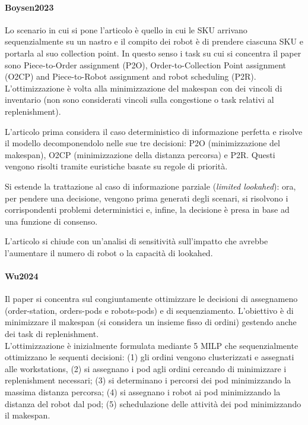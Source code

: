 \documentclass{article}
\begin{document}
\paragraph{Boysen2023 \cite{Boysen2023}}
Lo scenario in cui si pone l'articolo è quello in cui le SKU arrivano sequenzialmente su un nastro e il compito dei robot è di prendere ciascuna SKU e portarla al suo collection point. In questo senso i task su cui si concentra il paper sono Piece-to-Order assignment (P2O), Order-to-Collection Point assignment (O2CP) and Piece-to-Robot assignment and robot scheduling (P2R).
L'ottimizzazione è volta alla minimizzazione del makespan con dei vincoli di inventario (non sono considerati vincoli sulla congestione o task relativi al replenishment).

L'articolo prima considera il caso deterministico di informazione perfetta e risolve il modello decomponendolo nelle sue tre decisioni: P2O (minimizzazione del makespan), O2CP (minimizzazione della distanza percorsa) e P2R. Questi vengono risolti tramite euristiche basate su regole di priorità.

Si estende la trattazione al caso di informazione parziale (\emph{limited lookahed}): ora, per pendere una decisione, vengono prima generati degli scenari, si risolvono i corrispondenti problemi deterministici e, infine, la decisione è presa in base ad una funzione di consenso.

L'articolo si chiude con un'analisi di sensitività sull'impatto che avrebbe l'aumentare il numero di robot o la capacità di lookahed.


\paragraph{Wu2024 \cite{Wu2024}}
Il paper si concentra sul congiuntamente ottimizzare le decisioni di assegnameno (order-station, orders-pods e robots-pods) e di sequenziamento. L'obiettivo è di minimizzare il makespan (si considera un insieme fisso di ordini) gestendo anche dei task di replenishment. \\
L'ottimizzazione è inizialmente formulata mediante 5 MILP che sequenzialmente ottimizzano le sequenti decisioni: (1) gli ordini vengono clusterizzati e assegnati alle workstations, (2) si assegnano i pod agli ordini cercando di minimizzare i replenishment necessari; (3) si determinano i percorsi dei pod minimizzando la massima distanza percorsa; (4) si assegnano i robot ai pod minimizzando la distanza del robot dal pod; (5) schedulazione delle attività dei pod minimizzando il makespan.
\end{document}
